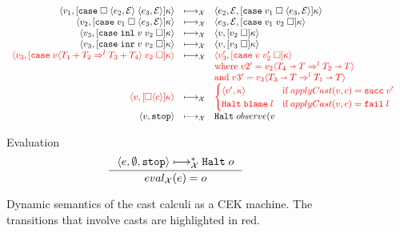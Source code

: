 \documentclass[acmsmall,review,anonymous]{acmart}\settopmatter{printfolios=true,printccs=false,printacmref=false}
\newcommand{\plus}[0]{+}
\newcommand{\sOOinspect}[3]{\langle#1,#2,#3\rangle}
\newcommand{\sOOreturn}[2]{\langle#1,#2\rangle}
\newcommand{\sOOhalt}[1]{\mathtt{Halt} \; #1}
\newcommand{\POOfun}[2]{#1 \shortrightarrow #2}
\newcommand{\POOprod}[2]{#1 \times #2}
\newcommand{\POOsum}[2]{#1 \plus #2}
\newcommand{\cOOcast}[3]{#1 \Rightarrow^{#2} #3}
\newcommand{\oOOblame}[1]{\mathtt{blame} \; #1}
\newcommand{\vOOcast}[2]{#1\langle#2\rangle}
\newcommand{\vOOinl}[1]{\mathtt{inl}\;#1}
\newcommand{\vOOinr}[1]{\mathtt{inr}\;#1}
\newcommand{\rOOsucc}[1]{\mathtt{succ}\;#1}
\newcommand{\rOOfail}[1]{\mathtt{fail}\;#1}
\newcommand{\kOOmt}[0]{\mathtt{stop}}
\newcommand{\kOOconsI}[5]{
	[\mathtt{cons}^{\POOprod{#1}{#2}} \; \square \; \langle#3,#4\rangle ]#5}
\newcommand{\kOOappII}[2]{
  [#1 \; \square]#2}
\newcommand{\kOOcaseI}[4]{
  [\mathtt{case} \; \square \; \langle#1,#3\rangle \; \langle#2,#3\rangle ]#4}
\newcommand{\kOOcaseII}[4]{
  [\mathtt{case} \; #1 \; \square \; \langle#2,#3\rangle ]#4}
\newcommand{\kOOcaseIII}[3]{
  [\mathtt{case} \; #1 \; #2 \; \square]#3}
\newcommand{\kOOcast}[2]{
  [\square \langle #1 \rangle]#2}
\newcommand{\hckOOmt}[0]{\mathtt{stop}}
\newcommand{\sidecond}[1]{\text{if}\;#1}
\newcommand{\judgeCreduceTrans}[2]{#1 \longmapsto_{\mathcal{X}}^{*} #2}
\newcommand{\judgeCeval}[2]{eval_{\mathcal{X}}(#1) = #2}
\newcommand{\redrule}[3]{#1 & \longmapsto_\mathcal{X} & #2 & #3\\}
\newcommand{\highlight}[1]{{\color{red} #1}}
\begin{document}
\begin{figure}
\[\begin{array}{rclr}
\redrule{
\sOOreturn{v_1}{\kOOcaseI{e_2}{e_3}{\mathcal{E}}{\kappa}}}{
\sOOinspect{e_2}{\mathcal{E}}{\kOOcaseII{v_1}{e_3}{\mathcal{E}}{\kappa}}}{}

\redrule{
\sOOreturn{v_2}{\kOOcaseII{v_1}{e_3}{\mathcal{E}}{\kappa}}}{
\sOOinspect{e_3}{\mathcal{E}}{
  \kOOcaseIII{v_1}{v_2}{\kappa}
}}{}  

\redrule{
\sOOreturn{v_3}{
  \kOOcaseIII{\vOOinl{v}}{v_2}{\kappa}
}
}{
\sOOreturn{v}{\kOOappII{v_2}{\kappa}}
}{}

\redrule{
  \sOOreturn{v_3}{
    \kOOcaseIII{\vOOinr{v}}{v_2}{\kappa}
  }
}{
\sOOreturn{v}{\kOOappII{v_3}{\kappa}}
}{}

\redrule{
  \highlight{\sOOreturn{v_3}{
    \kOOcaseIII{
        \vOOcast{v}{\cOOcast{\POOsum{T_1}{T_2}}{l}{\POOsum{T_3}{T_4}}}
      }{v_2}{\kappa}
  }}
}{
  \highlight{\sOOreturn{v_3'}{
      \kOOcaseIII{v}{v_2'}{\kappa}
  }}
}{\\&&
\highlight{\text{where}\;
v2' = \vOOcast{v_2}{\cOOcast{\POOfun{T_4}{T}}{l}{\POOfun{T_2}{T}}}}
\\&&
\highlight{\text{and}\;
v3' = \vOOcast{v_3}{\cOOcast{\POOfun{T_3}{T}}{l}{\POOfun{T_1}{T}}}}
}
  
  \redrule{
    \highlight{\sOOreturn{v}{
        \kOOcast{c}{\kappa}
      }}
  }{
\highlight{          
\begin{cases}
  \sOOreturn{v'}{\kappa} & \sidecond{applyCast(v,c) = \rOOsucc{v'}}
  \\
  \sOOhalt{\oOOblame{l}} & \sidecond{applyCast(v,c) = \rOOfail{l}}
\end{cases}}
  }{}
\redrule{
\sOOreturn{v}{\kOOmt}}{
\sOOhalt{observe(v}}{}
  \end{array}
  \]  
  
  Evaluation \fbox{$\judgeCeval{e}{o}$}
  \[
  \inference{
    \judgeCreduceTrans{
      \sOOinspect{e}{\emptyset}{\hckOOmt}
    }{\sOOhalt{o}}    
  }{
    \judgeCeval{e}{o}
  }
  \]
  
  \caption{Dynamic semantics of the cast calculi as a CEK
          machine. The transitions that involve casts are highlighted
          in red.}
  \label{fig:machine-cekc}
\end{figure}

\end{document}
